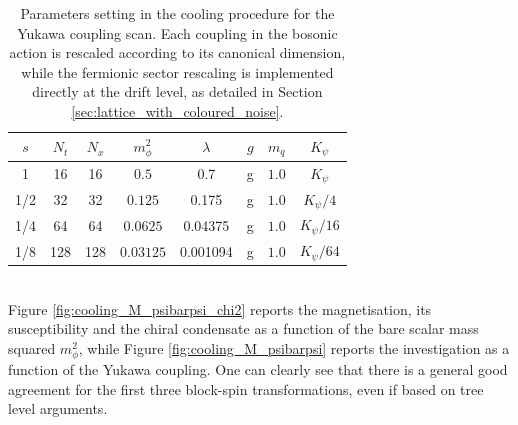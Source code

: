 \begin{table}[htp]
    \centering
    \begin{tabular}{cccccccc}
        \toprule
        $s$ & $N_t$ & $N_x$ & $m_\phi^2$ & $\lambda$ & $g$ & $m_q$& $K_\psi$ \\
        \midrule 
        1 & 16 & 16 & $0.5$ & 0.7 & g & $1.0$ & $K_\psi$ \\
        1/2 & 32 & 32 & $0.125$ & 0.175 & g & $1.0$ & $K_\psi/4$ \\
        1/4 & 64 & 64 & $0.0625$ & 0.04375 & g & $1.0$ & $K_\psi/16$ \\
        1/8 & 128 & 128 & $0.03125$ & 0.001094 & g & $1.0$ & $K_\psi/64$ \\
        \bottomrule
    \end{tabular}
    \caption[Parameter settings in the cooling procedure for the Yukawa coupling scan.]{Parameters setting in the cooling procedure for the Yukawa coupling scan. Each coupling in the bosonic action is rescaled according to its canonical dimension, while the fermionic sector rescaling is implemented directly at the drift level, as detailed in Section \ref{sec:lattice_with_coloured_noise}.}
    \label{tab:params_cooling_yukawa}
\end{table} \\
Figure \ref{fig:cooling_M_psibarpsi_chi2} reports the magnetisation, its susceptibility and the chiral condensate as a function of the bare scalar mass squared $m_\phi^2$, while Figure \ref{fig:cooling_M_psibarpsi} reports the investigation as a function of the Yukawa coupling.
One can clearly see that there is a general good agreement for the first three block-spin transformations, even if based on tree level arguments.
